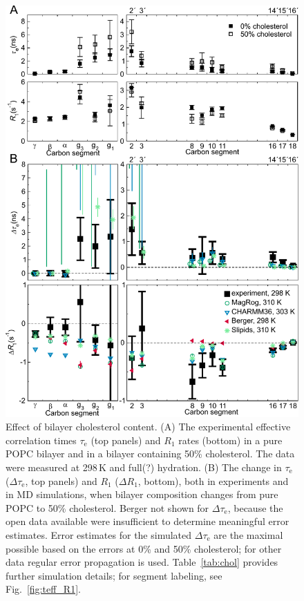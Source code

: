 \documentclass[journal=jpcbfk,manuscript=article,layout=twocolumn]{achemso}
\begin{document}
\begin{figure}[h!]
	\centering
	\includegraphics[width=\columnwidth]{./figures/cholesterol.pdf}  
	\caption{Effect of bilayer cholesterol content.
	(A) The experimental effective correlation times $\tau_\mathrm{e}$ (top panels) and $R_{1}$ rates (bottom) in a pure POPC bilayer and in a bilayer containing 50\% cholesterol. The data were measured at 298\,K and {\color{red} full(?) hydration}.
	(B) The change in $\tau_\mathrm{e}$ ($\Delta\tau_\mathrm{e}$, top panels) and $R_{1}$ ($\Delta R_{1}$, bottom),
	both in experiments and in MD simulations, when bilayer composition changes from pure POPC to 50\% cholesterol.
	Berger not shown for $\Delta\tau_\mathrm{e}$, because the open data available were insufficient to determine meaningful error estimates.
	Error estimates for the simulated $\Delta\tau_\mathrm e$ are the maximal possible
	based on the errors at 0\% and 50\% cholesterol;
	for other data regular error propagation is used.
	Table~\ref{tab:chol} provides further simulation details;
	for segment labeling, see Fig.~\ref{fig:teff_R1}.
	}
	\label{fig:chol}
\end{figure}
\end{document}
